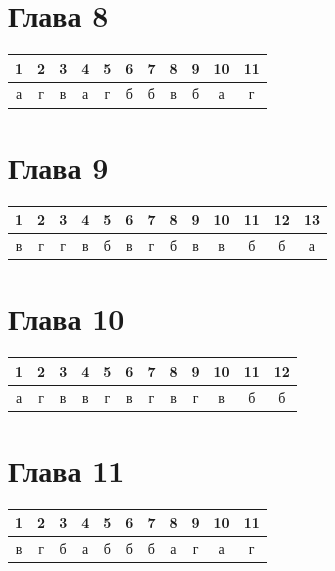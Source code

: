 \vspace{4mm}

\section*{Глава 8}

\noindent
\begin{tabular}{ccccccccccc}
\toprule
1 & 2 & 3 & 4 & 5 & 6 & 7 & 8 & 9 & 10 & 11 \\
\midrule
а & г & в & а & г & б & б & в & б & а & г \\
\bottomrule
\end{tabular}

\vspace{4mm}

\section*{Глава 9}

\noindent
\begin{tabular}{ccccccccccccc}
\toprule
1 & 2 & 3 & 4 & 5 & 6 & 7 & 8 & 9 & 10 & 11 & 12 & 13 \\
\midrule
в & г & г & в & б & в & г & б & в & в & б & б & а \\
\bottomrule
\end{tabular}

\vspace{4mm}

\section*{Глава 10}

\noindent
\begin{tabular}{cccccccccccc}
\toprule
1 & 2 & 3 & 4 & 5 & 6 & 7 & 8 & 9 & 10 & 11 & 12 \\
\midrule
а & г & в & в & г & в & г & в & г & в & б & б \\
\bottomrule
\end{tabular}

\vspace{4mm}

\section*{Глава 11}

\noindent
\begin{tabular}{ccccccccccc}
\toprule
1 & 2 & 3 & 4 & 5 & 6 & 7 & 8 & 9 & 10 & 11 \\
\midrule
в & г & б & а & б & б & б & а & г & а & г \\
\bottomrule
\end{tabular}

